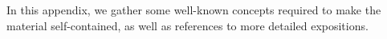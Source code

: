 \documentclass[reqno]{amsart}
\begin{document}
\begin{comment}
\begin{enumerate}
\item{objects given by sets,}
\item{vertical 1-morphisms given by functions,}
\item{horizontal 1-cells given by pairs:
\[
\begin{tikzpicture}[scale=1.5]
\node (D) at (-3,0) {$X$};
\node (E) at (-2,0) {$Z$};
\node (F) at (-1,0) {$Y$};
\node (A) at (0,0) {$P \in F(Z)$};
\path[->,font=\scriptsize,>=angle 90]
(D) edge node [above] {$i$} (E)
(F) edge node [above] {$o$} (E);
\end{tikzpicture}
\]
and}
\item{2-morphisms as maps of cospans in $\mathsf{Set}$:
\[
\begin{tikzpicture}[scale=1.5]
\node (E) at (3,0) {$X_1$};
\node (F) at (5,0) {$Y_1$};
\node (G) at (4,0) {$Z_1$};
\node (E') at (3,-1) {$X_2$};
\node (F') at (5,-1) {$Y_2$};
\node (G') at (4,-1) {$Z_2$};
\node (A) at (6,0) {$P_1 \in F(Z_1)$};
\node (B) at (6,-1) {$P_2 \in F(Z_2)$};
\path[->,font=\scriptsize,>=angle 90]
(F) edge node[above]{$o_1$} (G)
(E) edge node[left]{$f$} (E')
(F) edge node[right]{$g$} (F')
(G) edge node[left]{$h$} (G')
(E) edge node[above]{$i_1$} (G)
(E') edge node[above]{$i_2$} (G')
(F') edge node[above]{$o_2$} (G');
\end{tikzpicture}
\]
together with a morphism of Petri nets $\tau \maps F(h)(P_1) \to P_2$ in $F(Z_2)$.}
\end{enumerate}
Thus we have a symmetric monoidal double category $\lOpen(\Petri)$ of open Petri nets obtained from structured cospans and a symmetric monoidal double category $F\lCsp$ of open Petri nets obtain from decorated cospans, and of course, we have an equivalence $\lOpen(\Petri) \sim F\lCsp$ of symmetric monoidal double categories by \cref{thm:equiv}.
\end{comment}



\appendix

\section{}
In this appendix, we gather some well-known concepts required to make the material self-contained, as well as references to more detailed expositions.
\end{document}
